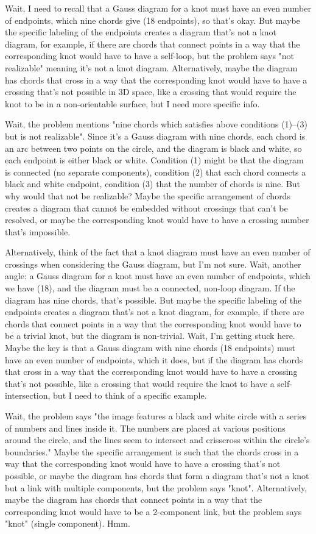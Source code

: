 Wait, I need to recall that a Gauss diagram for a knot must have an even number of endpoints, which nine chords give (18 endpoints), so that's okay. But maybe the specific labeling of the endpoints creates a diagram that's not a knot diagram, for example, if there are chords that connect points in a way that the corresponding knot would have to have a self-loop, but the problem says "not realizable" meaning it's not a knot diagram. Alternatively, maybe the diagram has chords that cross in a way that the corresponding knot would have to have a crossing that's not possible in 3D space, like a crossing that would require the knot to be in a non-orientable surface, but I need more specific info.

Wait, the problem mentions "nine chords which satisfies above conditions (1)--(3) but is not realizable". Since it's a Gauss diagram with nine chords, each chord is an arc between two points on the circle, and the diagram is black and white, so each endpoint is either black or white. Condition (1) might be that the diagram is connected (no separate components), condition (2) that each chord connects a black and white endpoint, condition (3) that the number of chords is nine. But why would that not be realizable? Maybe the specific arrangement of chords creates a diagram that cannot be embedded without crossings that can't be resolved, or maybe the corresponding knot would have to have a crossing number that's impossible.

Alternatively, think of the fact that a knot diagram must have an even number of crossings when considering the Gauss diagram, but I'm not sure. Wait, another angle: a Gauss diagram for a knot must have an even number of endpoints, which we have (18), and the diagram must be a connected, non-loop diagram. If the diagram has nine chords, that's possible. But maybe the specific labeling of the endpoints creates a diagram that's not a knot diagram, for example, if there are chords that connect points in a way that the corresponding knot would have to be a trivial knot, but the diagram is non-trivial. Wait, I'm getting stuck here. Maybe the key is that a Gauss diagram with nine chords (18 endpoints) must have an even number of endpoints, which it does, but if the diagram has chords that cross in a way that the corresponding knot would have to have a crossing that's not possible, like a crossing that would require the knot to have a self-intersection, but I need to think of a specific example.

Wait, the problem says "the image features a black and white circle with a series of numbers and lines inside it. The numbers are placed at various positions around the circle, and the lines seem to intersect and crisscross within the circle's boundaries." Maybe the specific arrangement is such that the chords cross in a way that the corresponding knot would have to have a crossing that's not possible, or maybe the diagram has chords that form a diagram that's not a knot but a link with multiple components, but the problem says "knot". Alternatively, maybe the diagram has chords that connect points in a way that the corresponding knot would have to be a 2-component link, but the problem says "knot" (single component). Hmm.

